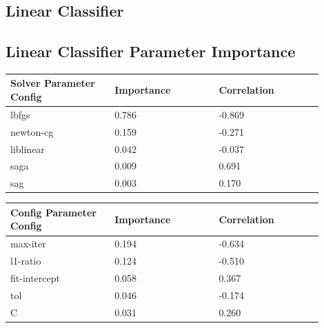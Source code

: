 \documentclass[11pt]{article}
\begin{document}
\begin{appendices}
  
  \FloatBarrier
\newpage
\section{Linear Classifier}

\subsection{Linear Classifier Parameter Importance}
  \begin{table}[ht]
    \centering
    \begin{tabular}{|p{0.3\linewidth} | p{0.3\linewidth}| p{0.3\linewidth}|} 
      \hline
      \textbf{Solver Parameter Config}  & \textbf{Importance} & \textbf{Correlation} \\ \hline
      lbfgs & 0.786 & -0.869 \\ \hline
      newton-cg & 0.159 & -0.271 \\ \hline
      liblinear & 0.042 & -0.037 \\ \hline
      saga & 0.009 & 0.691 \\ \hline
      sag & 0.003 & 0.170 \\ \hline
    \end{tabular}
  \end{table}\label{LC_ParamImp1}

  \begin{table}[ht]
    \centering
    \begin{tabular}{|p{0.3\linewidth} | p{0.3\linewidth}| p{0.3\linewidth}|} 
      \hline
      \textbf{Config Parameter Config}  & \textbf{Importance} & \textbf{Correlation} \\ \hline
      max-iter & 0.194 & -0.634 \\ \hline
      l1-ratio & 0.124 & -0.510 \\ \hline
      fit-intercept & 0.058 & 0.367 \\ \hline
      tol & 0.046 & -0.174 \\ \hline
      C & 0.031 & 0.260 \\ \hline
    \end{tabular}
  \end{table}\label{LC_ParamImp2}


\end{appendices}
\end{document}
